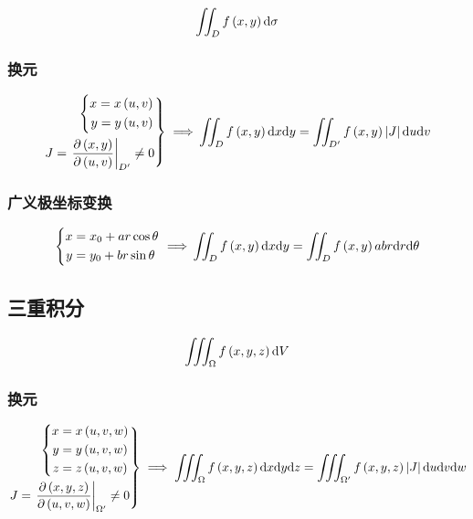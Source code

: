 \documentclass{article}
\begin{document}
\begin{definition}[$\d\sigma=\d x\d y$]
    \[\iint_Df\left(x,y\right)\mathrm d\sigma\]
\end{definition}

\subsubsection{换元}

\[\left.\begin{aligned}
        \left\{\begin{aligned}
                   x=x\left(u,v\right) \\
                   y=y\left(u,v\right)
               \end{aligned}\right. \\
        J=\left.\frac{\partial\left(x,y\right)}{\partial\left(u,v\right)}\right|_{D^\prime}\neq0
    \end{aligned}\right\}\implies\\
    \iint_Df\left(x,y\right)\mathrm d x\mathrm d y=
    \iint_{D^\prime}f\left(x,y\right)\left|J\right|\mathrm d u\mathrm d v\]

\subsubsection{广义极坐标变换}

\[\left\{\begin{aligned}
        x & =x_0+ar\cos\theta \\
        y & =y_0+br\sin\theta
    \end{aligned}\right.\implies\\
    \iint_Df\left(x,y\right)\mathrm d x\mathrm d y=
    \iint_Df\left(x,y\right)abr\mathrm d r\mathrm d\theta\]

\subsection{三重积分}

\begin{definition}[$\d V=\d x\d y\d z$]
    \[\iiint_\Omega f\left(x,y,z\right)\mathrm d V\]
\end{definition}

\subsubsection{换元}

\[\left.\begin{aligned}
        \left\{\begin{aligned}
                   x & =x\left(u,v,w\right) \\
                   y & =y\left(u,v,w\right) \\
                   z & =z\left(u,v,w\right)
               \end{aligned}\right. \\
        J=\left.\frac{\partial\left(x,y,z\right)}{\partial\left(u,v,w\right)}\right|_{\Omega^\prime}\neq0
    \end{aligned}\right\}\implies
    \iiint_\Omega f\left(x,y,z\right)\mathrm d x\mathrm d y\mathrm d z=
    \iiint_{\Omega^\prime}f\left(x,y,z\right)\left|J\right|\mathrm d u\mathrm d v\mathrm d w\]
\end{document}
